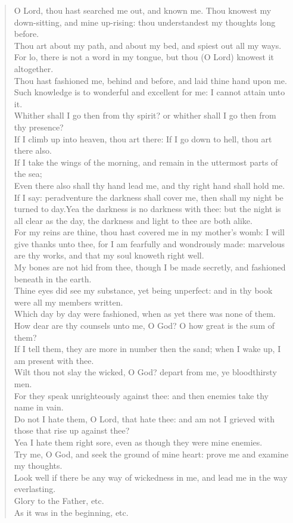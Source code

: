 \documentclass[
]{book}
\begin{document}
\begin{quote}
O Lord, thou hast searched me out, and known me. Thou knowest my down-sitting, and mine up-rising: thou understandest my thoughts long before.\\
Thou art about my path, and about my bed, and spiest out all my ways.\\
For lo, there is not a word in my tongue, but thou (O Lord) knowest it altogether.\\
Thou hast fashioned me, behind and before, and laid thine hand upon me.\\
Such knowledge is to wonderful and excellent for me: I cannot attain unto it.\\
Whither shall I go then from thy spirit? or whither shall I go then from thy presence?\\
If I climb up into heaven, thou art there: If I go down to hell, thou art there also.\\
If I take the wings of the morning, and remain in the uttermost parts of the sea;\\
Even there also shall thy hand lead me, and thy right hand shall hold me.\\
If I say: peradventure the darkness shall cover me, then shall my night be turned to day.Yea the darkness is no darkness with thee: but the night is all clear as the day, the darkness and light to thee are both alike.\\
For my reins are thine, thou hast covered me in my mother's womb: I will give thanks unto thee, for I am fearfully and wondrously made: marvelous are thy works, and that my soul knoweth right well.\\
My bones are not hid from thee, though I be made secretly, and fashioned beneath in the earth.\\
Thine eyes did see my substance, yet being unperfect: and in thy book were all my members written.\\
Which day by day were fashioned, when as yet there was none of them.\\
How dear are thy counsels unto me, O God? O how great is the sum of them?\\
If I tell them, they are more in number then the sand; when I wake up, I am present with thee.\\
Wilt thou not slay the wicked, O God? depart from me, ye bloodthirsty men.\\
For they speak unrighteously against thee: and then enemies take thy name in vain.\\
Do not I hate them, O Lord, that hate thee: and am not I grieved with those that rise up against thee?\\
Yea I hate them right sore, even as though they were mine enemies.\\
Try me, O God, and seek the ground of mine heart: prove me and examine my thoughts.\\
Look well if there be any way of wickedness in me, and lead me in the way everlasting.\\
Glory to the Father, etc.\\
As it was in the beginning, etc.
\end{quote}
\end{document}
